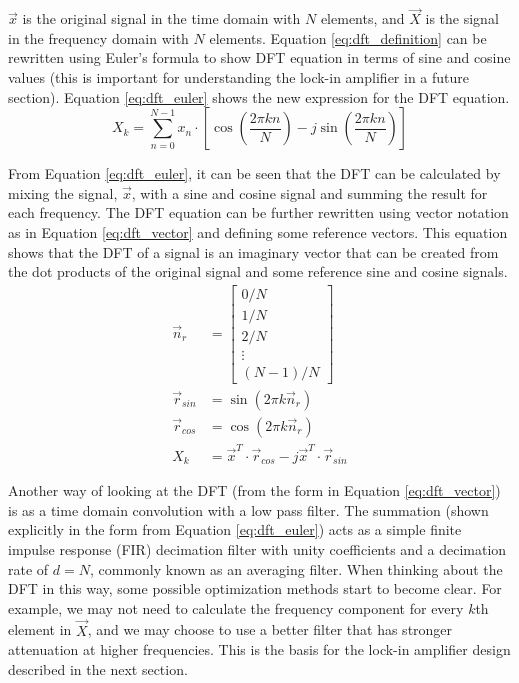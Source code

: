$\vec{x}$ is the original signal in the time domain with $N$ elements, and $\vec{X}$ is the signal in the frequency domain with $N$ elements.  Equation \ref{eq:dft_definition} can be rewritten using Euler's formula to show DFT equation in terms of sine and cosine values (this is important for understanding the lock-in amplifier in a future section).  Equation \ref{eq:dft_euler} shows the new expression for the DFT equation.
\begin{equation} \label{eq:dft_euler}
	X_k = \sum_{n=0}^{N-1}{x_n \cdot \left[ \cos{\left(\frac{2 \pi k n}{N}\right)} - j \sin{\left(\frac{2 \pi k n}{N}\right)} \right]}
\end{equation}

From Equation \ref{eq:dft_euler}, it can be seen that the DFT can be calculated by mixing the signal, $\vec{x}$, with a sine and cosine signal and summing the result for each frequency.  The DFT equation can be further rewritten using vector notation as in Equation \ref{eq:dft_vector} and defining some reference vectors.  This equation shows that the DFT of a signal is an imaginary vector that can be created from the dot products of the original signal and some reference sine and cosine signals.
\begin{align}
	\vec{n}_r &= 
		\begin{bmatrix}
			0/N \\
			1/N \\
			2/N \\
			\vdots \\
			(N-1)/N	
		 \end{bmatrix} \\
	\vec{r}_{sin} &= \sin{\left(2 \pi k \vec{n}_r\right)} \\
	\vec{r}_{cos} &= \cos{\left(2 \pi k \vec{n}_r\right)} \\
	X_k &= \vec{x}^T \cdot \vec{r}_{cos} - j \vec{x}^T \cdot \vec{r}_{sin}  \label{eq:dft_vector}
\end{align}

Another way of looking at the DFT (from the form in Equation \ref{eq:dft_vector}) is as a time domain convolution with a low pass filter.  The summation (shown explicitly in the form from Equation \ref{eq:dft_euler}) acts as a simple finite impulse response (FIR) decimation filter with unity coefficients and a decimation rate of $d=N$, commonly known as an averaging filter.  When thinking about the DFT in this way, some possible optimization methods start to become clear.  For example, we may not need to calculate the frequency component for every $k$th element in $\vec{X}$, and we may choose to use a better filter that has stronger attenuation at higher frequencies.  This is the basis for the lock-in amplifier design described in the next section.



